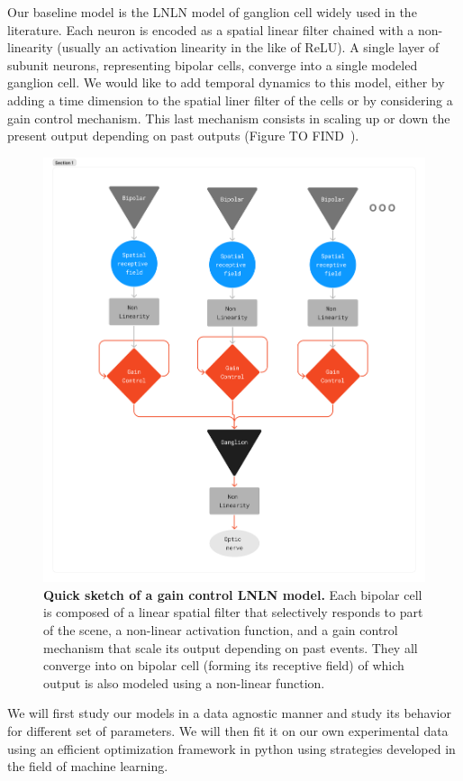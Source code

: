Our baseline model is the LNLN model of ganglion cell widely used in the
literature. Each neuron is encoded as a spatial linear filter chained with a
non-linearity (usually an activation linearity in the like of ReLU). A single
layer of subunit neurons, representing bipolar cells, converge into a single
modeled ganglion cell.	We would like to add temporal dynamics to this model,
either by adding a time dimension to the spatial liner filter of the cells or
by considering a gain control mechanism. This last mechanism consists in
scaling up or down the present output depending on past outputs (Figure
TO FIND~\cite{}).

\begin{figure}
    \centering
    \includegraphics[scale = 0.2]{pics/GCModelDiagram.png}
    \caption{\textbf{Quick sketch of a gain control LNLN model.} Each bipolar
        cell is
        composed of a linear spatial filter that selectively responds to part
        of the scene,
        a non-linear activation function, and a gain control mechanism that
        scale its output
        depending on past events. They all converge into on bipolar cell
        (forming its receptive field)
        of which output is also modeled using a non-linear function.}
    \label{fig:LNLN}
\end{figure}
We will first study our models in a data agnostic manner and study its behavior
for different set of parameters. We will then fit it on our own experimental
data using an efficient optimization framework in python using strategies
developed in the field of machine learning.

